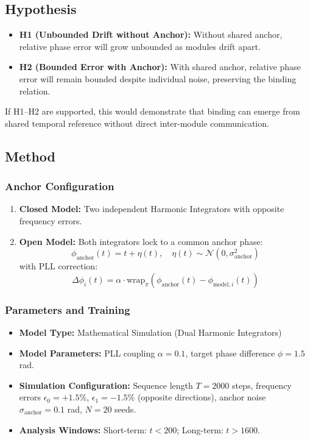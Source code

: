 \documentclass{article}
\begin{document}
\subsection{Hypothesis}
\begin{itemize}
    \item \textbf{H1 (Unbounded Drift without Anchor):} Without shared anchor, relative phase error will grow unbounded as modules drift apart.
    \item \textbf{H2 (Bounded Error with Anchor):} With shared anchor, relative phase error will remain bounded despite individual noise, preserving the binding relation.
\end{itemize}

If H1--H2 are supported, this would demonstrate that binding can emerge from shared temporal reference without direct inter-module communication.

\subsection{Method}

\subsubsection{Anchor Configuration}
\begin{enumerate}
    \item \textbf{Closed Model:} Two independent Harmonic Integrators with opposite frequency errors.
    \item \textbf{Open Model:} Both integrators lock to a common anchor phase:
    \begin{equation}
        \phi_{\text{anchor}}(t) = t + \eta(t), \quad \eta(t) \sim \mathcal{N}(0, \sigma_{\text{anchor}}^2)
    \end{equation}
    with PLL correction:
    \begin{equation}
        \Delta\phi_i(t) = \alpha \cdot \text{wrap}_{\pi}\left(\phi_{\text{anchor}}(t) - \phi_{\text{model},i}(t)\right)
    \end{equation}
\end{enumerate}

\subsubsection{Parameters and Training}
\begin{itemize}
    \item \textbf{Model Type:} Mathematical Simulation (Dual Harmonic Integrators)
    \item \textbf{Model Parameters:} PLL coupling $\alpha = 0.1$, target phase difference $\phi = 1.5$ rad.
    \item \textbf{Simulation Configuration:} Sequence length $T=2000$ steps, frequency errors $\epsilon_0 = +1.5\%$, $\epsilon_1 = -1.5\%$ (opposite directions), anchor noise $\sigma_{\text{anchor}} = 0.1$ rad, $N=20$ seeds.
    \item \textbf{Analysis Windows:} Short-term: $t < 200$; Long-term: $t > 1600$.
\end{itemize}
\end{document}
